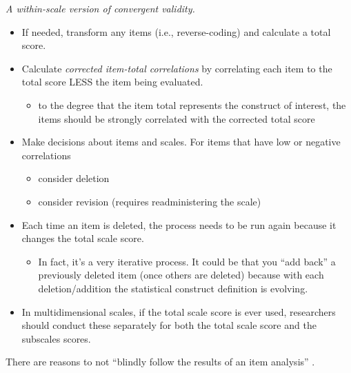 \documentclass[
  english,
]{book}
\providecommand{\tightlist}{%
  \setlength{\itemsep}{0pt}\setlength{\parskip}{0pt}}
\begin{document}
\emph{A within-scale version of convergent validity.}

\begin{itemize}
\tightlist
\item
  If needed, transform any items (i.e., reverse-coding) and calculate a total score.
\item
  Calculate \emph{corrected item-total correlations} by correlating each item to the total score LESS the item being evaluated.

  \begin{itemize}
  \tightlist
  \item
    to the degree that the item total represents the construct of interest, the items should be strongly correlated with the corrected total score
  \end{itemize}
\item
  Make decisions about items and scales. For items that have low or negative correlations

  \begin{itemize}
  \tightlist
  \item
    consider deletion
  \item
    consider revision (requires readministering the scale)
  \end{itemize}
\item
  Each time an item is deleted, the process needs to be run again because it changes the total scale score.

  \begin{itemize}
  \tightlist
  \item
    In fact, it's a very iterative process. It could be that you ``add back'' a previously deleted item (once others are deleted) because with each deletion/addition the statistical construct definition is evolving.
  \end{itemize}
\item
  In multidimensional scales, if the total scale score is ever used, researchers should conduct these separately for both the total scale score and the subscales scores.
\end{itemize}

There are reasons to not ``blindly follow the results of an item analysis'' \citep{green_using_2010}.
\end{document}

